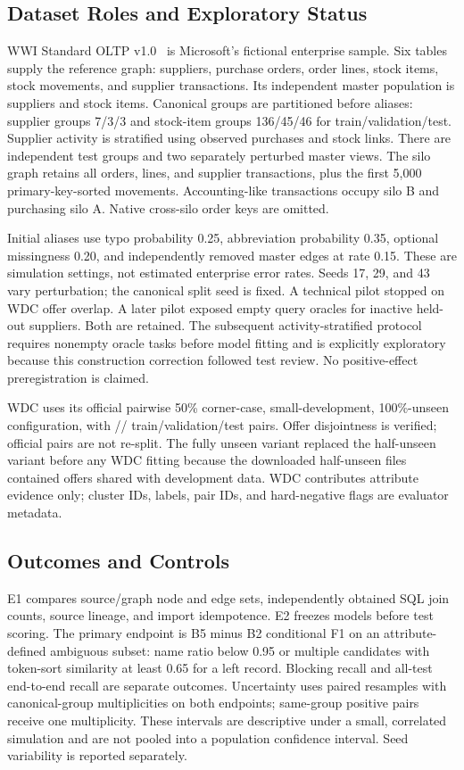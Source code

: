 \documentclass[conference]{IEEEtran}
\begin{document}
\subsection{Dataset Roles and Exploratory Status}
WWI Standard OLTP v1.0~\cite{wwi} is Microsoft's fictional enterprise sample. Six tables supply the reference graph: suppliers, purchase orders, order lines, stock items, stock movements, and supplier transactions. Its independent master population is \SupplierCount{} suppliers and \ItemCount{} stock items. Canonical groups are partitioned before aliases: supplier groups 7/3/3 and stock-item groups 136/45/46 for train/validation/test. Supplier activity is stratified using observed purchases and stock links. There are \TestGroups{} independent test groups and two separately perturbed master views. The silo graph retains all orders, lines, and supplier transactions, plus the first 5,000 primary-key-sorted movements. Accounting-like transactions occupy silo B and purchasing silo A. Native cross-silo order keys are omitted.

Initial aliases use typo probability 0.25, abbreviation probability 0.35, optional missingness 0.20, and independently removed master edges at rate 0.15. These are simulation settings, not estimated enterprise error rates. Seeds 17, 29, and 43 vary perturbation; the canonical split seed is fixed. A technical pilot stopped on WDC offer overlap. A later pilot exposed empty query oracles for inactive held-out suppliers. Both are retained. The subsequent activity-stratified protocol requires nonempty oracle tasks before model fitting and is explicitly exploratory because this construction correction followed test review. No positive-effect preregistration is claimed.

WDC uses its official pairwise 50\% corner-case, small-development, 100\%-unseen configuration, with \WdcTrain{}/\WdcValidation{}/\WdcTest{} train/validation/test pairs. Offer disjointness is verified; official pairs are not re-split. The fully unseen variant replaced the half-unseen variant before any WDC fitting because the downloaded half-unseen files contained offers shared with development data. WDC contributes attribute evidence only; cluster IDs, labels, pair IDs, and hard-negative flags are evaluator metadata.

\subsection{Outcomes and Controls}
E1 compares source/graph node and edge sets, \SqlJoinCount{} independently obtained SQL join counts, source lineage, and import idempotence. E2 freezes models before test scoring. The primary endpoint is B5 minus B2 conditional F1 on an attribute-defined ambiguous subset: name ratio below 0.95 or multiple candidates with token-sort similarity at least 0.65 for a left record. Blocking recall and all-test end-to-end recall are separate outcomes. Uncertainty uses \BootstrapCount{} paired resamples with canonical-group multiplicities on both endpoints; same-group positive pairs receive one multiplicity. These intervals are descriptive under a small, correlated simulation and are not pooled into a population confidence interval. Seed variability is reported separately.
\end{document}
